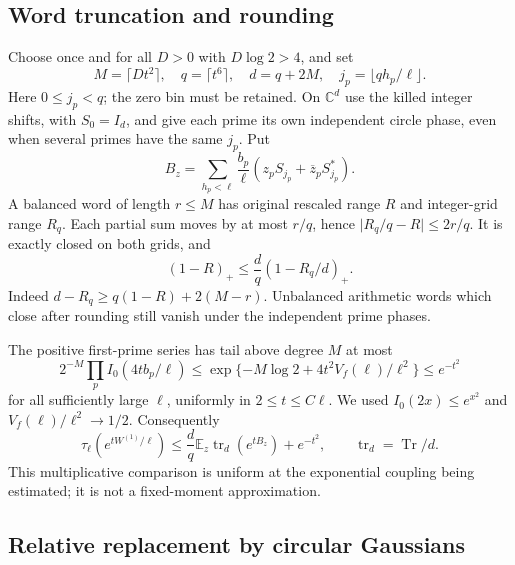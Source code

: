 \documentclass[11pt,reqno]{amsart}
\numberwithin{equation}{section}
\newcommand{\C}{\mathbb C}
\newcommand{\E}{\mathbb E}
\newcommand{\Tr}{\operatorname{Tr}}
\newcommand{\tr}{\operatorname{tr}}
\newcommand{\abs}[1]{\lvert#1\rvert}
\begin{document}
\subsection*{Word truncation and rounding}

Choose once and for all $D>0$ with $D\log2>4$, and set
\begin{equation}\label{eq:mesh}
 M=\lceil Dt^2\rceil,\quad q=\lceil t^6\rceil,\quad
 d=q+2M,\quad j_p=\lfloor qh_p/\ell\rfloor.
\end{equation}
Here $0\le j_p<q$; the zero bin must be retained.
On $\C^d$ use the killed integer shifts, with $S_0=I_d$, and
give each prime its own independent circle phase, even when
several primes have the same $j_p$. Put
\[
 B_z=\sum_{h_p<\ell}\frac{b_p}{\ell}
                 (z_pS_{j_p}+\overline z_pS_{j_p}^*).
\]
A balanced word of length $r\le M$ has original rescaled range
$R$ and integer-grid range $R_q$. Each partial sum moves by at
most $r/q$, hence $\abs{R_q/q-R}\le2r/q$. It is exactly closed
on both grids, and
\begin{equation}\label{eq:mask-domination}
 (1-R)_+\le\frac dq(1-R_q/d)_+.
\end{equation}
Indeed $d-R_q\ge q(1-R)+2(M-r)$. Unbalanced arithmetic words
which close after rounding still vanish under the independent
prime phases.

The positive first-prime series has tail above degree $M$ at most
\[
 2^{-M}\prod_p I_0(4tb_p/\ell)
 \le\exp\{-M\log2+4t^2V_f(\ell)/\ell^2\}
 \le e^{-t^2}
\]
for all sufficiently large $\ell$, uniformly in $2\le t\le C\ell$.
We used $I_0(2x)\le e^{x^2}$ and
$V_f(\ell)/\ell^2\to1/2$. Consequently
\begin{equation}\label{eq:grid-comparison}
 \tau_\ell(e^{tW^{(1)}/\ell})
       \le\frac dq\E_z\tr_d(e^{tB_z})+e^{-t^2},
 \qquad \tr_d=\Tr/d.
\end{equation}
This multiplicative comparison is uniform at the exponential
coupling being estimated; it is not a fixed-moment approximation.

\subsection*{Relative replacement by circular Gaussians}
\end{document}
